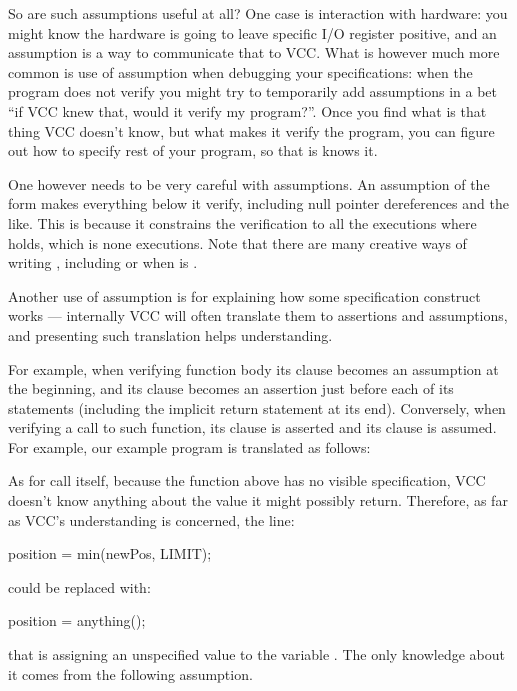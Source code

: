 So are such assumptions useful at all?
One case is interaction with hardware: you might know the hardware is going to leave
specific I/O register positive, and an assumption is a way to communicate that to VCC.
What is however much more common is use of assumption when debugging your specifications:
when the program does not verify you might try to temporarily add assumptions in a bet
``if VCC knew that, would it verify my program?''.
Once you find what is that thing VCC doesn't know, but what makes it verify the program,
you can figure out how to specify rest of your program, so that is knows it.

One however needs to be very careful with assumptions.
An assumption of the form  makes everything below
it verify, including null pointer dereferences and the like.
This is because it constrains the verification to all the executions
where \vcc{\false} holds, which is none executions.
Note that there are many creative ways of writing \vcc{\false}, including
 or  when  is .

Another use of assumption is for explaining how some specification construct works ---
internally VCC will often translate them to assertions and assumptions, and presenting
such translation helps understanding.

For example, when verifying function body
its  clause becomes an assumption at the beginning, and its
 clause becomes an assertion just before each of its  statements
(including the implicit return statement at its end).
Conversely, when verifying a call to such function, its  clause is asserted
and its  clause is assumed. For example, our example program is translated
as follows:


As for call itself, because the  function above has no visible specification,
VCC doesn't know anything about the value it might possibly return.
Therefore, as far as VCC's understanding is concerned, the line:
\begin{VCC}
position = min(newPos, LIMIT);
\end{VCC}
\noindent
could be replaced with:
\begin{VCC}
position = anything();
\end{VCC}
\noindent
that is assigning an unspecified value
to the variable . 
The only knowledge about it comes from the following assumption.

